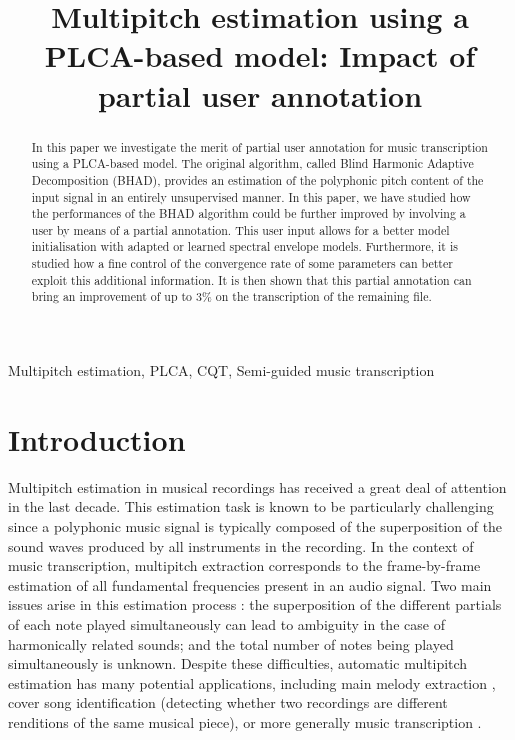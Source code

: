 \documentclass{article}
\title{Multipitch estimation using a PLCA-based model: Impact of partial user annotation} %
\begin{document}
\ninept
%
\maketitle
%
\begin{abstract}
In this paper we investigate the merit of partial user annotation for music transcription using a PLCA-based model. The original algorithm, called Blind Harmonic Adaptive Decomposition (BHAD), provides an estimation of the polyphonic pitch content of the input signal in an entirely unsupervised manner. In this paper, we have studied how the performances of the BHAD algorithm could be further improved by involving a user by means of a partial annotation. This user input allows for a better model initialisation with adapted or learned spectral envelope models. Furthermore, it is studied how a fine control of the convergence rate of some parameters can better exploit this additional information. It is then shown that this partial annotation can bring an improvement of up to 3\% on the transcription of the remaining file.  
\end{abstract}
%
\begin{keywords}
Multipitch estimation, PLCA, CQT, Semi-guided music transcription
\end{keywords}
%

\vspace{0.4cm}

\section{Introduction}
\label{sec:intro}

Multipitch estimation in musical recordings has received a great deal of attention in the last decade. This estimation task is known to be particularly challenging since a polyphonic music signal is typically composed of the
superposition of the sound waves produced by all instruments in the recording. In the context of music transcription, 
multipitch extraction corresponds to the frame-by-frame estimation of all fundamental frequencies present in an audio signal. 
Two main issues arise in this estimation process : 
the superposition of the different partials of each note played simultaneously can lead to ambiguity in the case of harmonically related sounds; and the total number of notes being played simultaneously is unknown.  
Despite these difficulties, automatic multipitch estimation has many potential applications, including main melody extraction \cite{JS:SigMag2014, Durrieu2011, toosMelodyICASSP10}, cover song identification \cite{salamonVersionIDQBH-MMIR13} (detecting whether two recordings are different renditions of the same musical piece), or more generally music transcription \cite{HainsworthPhD}.
\end{document}
